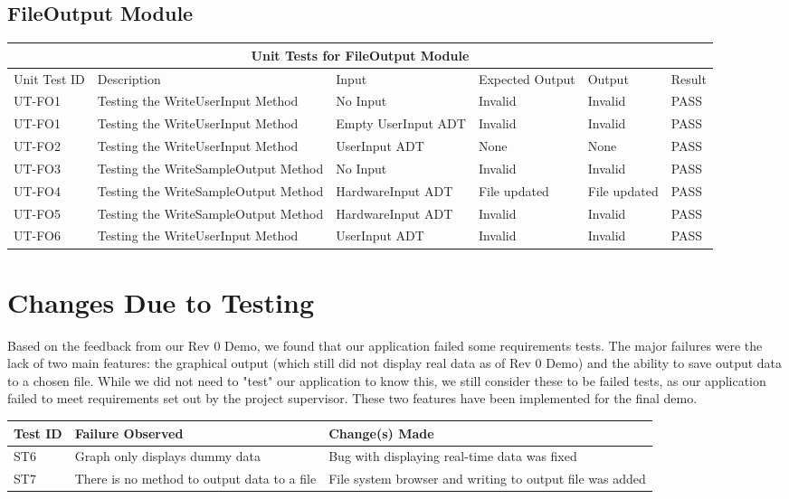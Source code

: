 \documentclass[12pt, titlepage]{article}
\begin{document}
 \subsection{FileOutput Module}
\begin{tabular}{ |p{1.5cm}||p{2.5cm}|p{3cm}|p{2cm}|p{2cm}|p{1.5cm}|}
  \hline
  \multicolumn{6}{|c|}{Unit Tests for FileOutput Module} \\
  \hline
  Unit Test ID & Description & Input & Expected Output & Output & Result\\
  \hline
  UT-FO1   & Testing the WriteUserInput Method  &  No Input & Invalid & Invalid & PASS \\
  \hline
  UT-FO1   & Testing the WriteUserInput Method  &  Empty UserInput ADT & Invalid & Invalid & PASS \\
  \hline
  UT-FO2   & Testing the WriteUserInput Method  &  UserInput ADT & None & None & PASS \\
  \hline
  UT-FO3   & Testing the WriteSampleOutput Method  &  No Input & Invalid & Invalid & PASS \\
  \hline
  UT-FO4   & Testing the WriteSampleOutput Method  &   HardwareInput ADT & File updated & File updated & PASS \\
  \hline
  UT-FO5  & Testing the WriteSampleOutput Method  &  HardwareInput ADT & Invalid & Invalid & PASS \\
  \hline
  UT-FO6  & Testing the WriteUserInput Method  &  UserInput ADT & Invalid & Invalid & PASS \\
  \hline
 \end{tabular}
\section{Changes Due to Testing}

\noindent Based on the feedback from our Rev 0 Demo, we found that our application failed some requirements tests. The major failures were the lack of two main features: the graphical output (which still did not display real data as of Rev 0 Demo) and the ability to save output data to a chosen file. While we did not need to "test" our application to know this, we still consider these to be failed tests, as our application failed to meet requirements set out by the project supervisor. These two features have been implemented for the final demo. \\

\begin{tabular}{ |p{3cm}|p{5cm}|p{5cm}| }
  \hline
  \textbf{Test ID} & \textbf{Failure Observed} & \textbf{Change(s) Made} \\
  \hline 
  ST6 & Graph only displays dummy data & Bug with displaying real-time data was fixed \\ \hline
  ST7 & There is no method to output data to a file & File system browser and writing to output file was added \\
  \hline
 \end{tabular}
\end{document}
